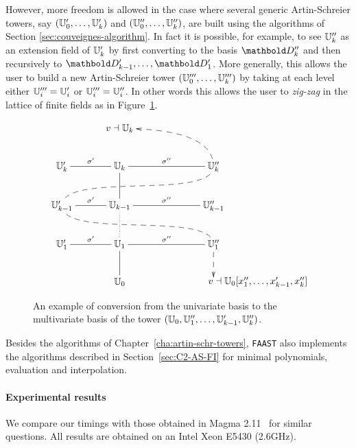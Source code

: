   However, more freedom is allowed in the case where
several generic Artin-Schreier towers, say $(\mathbb{U}_0',\ldots,\mathbb{U}_k')$ and
$(\mathbb{U}_0'',\ldots,\mathbb{U}_k'')$, are built using the algorithms of Section
\ref{sec:couveignes-algorithm}. In fact it is possible, for example,
to see $\mathbb{U}_k''$ as an extension field of $\mathbb{U}'_k$ by first converting
to the basis $\basis{D}''_k$ and then recursively to
$\basis{D}'_{k-1},\ldots,\basis{D}'_1$. More generally, this allows
the user to build a new Artin-Schreier tower
$(\mathbb{U}_0''',\ldots,\mathbb{U}_k''')$ by taking at each level either
$\mathbb{U}_i'''=\mathbb{U}_i'$ or $\mathbb{U}_i'''=\mathbb{U}_i''$.  In other words this allows the
user to \emph{zig-zag} in the lattice of finite fields as in
Figure~\ref{fig:lattice}.

\begin{figure}
  \centering
  \begin{equation*}
    \xymatrix@C=1cm{
      & v\wrt\U_k \ar@{<--}@(r,u)[dr] \\
      \U_k'\ar@{-}[r]^{\sigma'} & \U_k\ar@{-}[d] & \U_k''\ar@{-}[l]_{\sigma''} \ar@{--}@(d,u)[dll]\\
      \U_{k-1}'\ar@{-}[r]^{\sigma'} \ar@{--}@(d,u)[drr] & \U_{k-1}\ar@{.}[d] & \U_{k-1}''\ar@{-}[l]_{\sigma''}\\
      \U_1'\ar@{-}[r]^{\sigma'} & \U_1\ar@{-}[d] & \U_1''\ar@{-}[l]_{\sigma''}\ar@{-->}[d]\\
      & \U_0 & *[r]{v\wrt\U_0[x_1'',\ldots,x_{k-1}',x_k'']}
    }
  \end{equation*}
  \caption{An example of conversion from the univariate basis to the
    multivariate basis of the tower $(\mathbb{U}_0,\mathbb{U}_1'',\ldots,\mathbb{U}_{k-1}',\mathbb{U}_k'')$.}
  \label{fig:lattice}
\end{figure}

Besides the algorithms of Chapter~\ref{cha:artin-schr-towers},
\texttt{FAAST} also implements the algorithms described in
Section~\ref{sec:C2-AS-FI} for minimal polynomials, evaluation and
interpolation.

\paragraph{Experimental results} We compare our timings with those
obtained in Mag\-ma 2.11~\cite{MAGMA} for similar questions.  All
results are obtained on an Intel Xeon E5430 (2.6GHz).


